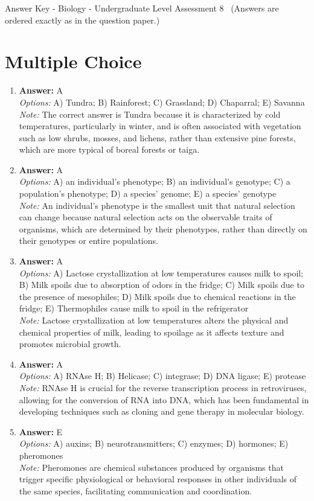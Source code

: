 \documentclass[12pt]{article}
\begin{document}
\begin{center}
Answer Key - Biology - Undergraduate Level Assessment 8 \
\small (Answers are ordered exactly as in the question paper.)
\end{center}

\section*{Multiple Choice}
\begin{enumerate}[label=\arabic*.]
\item \textbf{Answer:} A
\\ \textit{Options:} A) Tundra; B) Rainforest; C) Grassland; D) Chaparral; E) Savanna
\\ \textit{Note:} The correct answer is Tundra because it is characterized by cold temperatures, particularly in winter, and is often associated with vegetation such as low shrubs, mosses, and lichens, rather than extensive pine forests, which are more typical of boreal forests or taiga.
\item \textbf{Answer:} A
\\ \textit{Options:} A) an individual's phenotype; B) an individual's genotype; C) a population's phenotype; D) a species' genome; E) a species' genotype
\\ \textit{Note:} An individual's phenotype is the smallest unit that natural selection can change because natural selection acts on the observable traits of organisms, which are determined by their phenotypes, rather than directly on their genotypes or entire populations.
\item \textbf{Answer:} A
\\ \textit{Options:} A) Lactose crystallization at low temperatures causes milk to spoil; B) Milk spoils due to absorption of odors in the fridge; C) Milk spoils due to the presence of mesophiles; D) Milk spoils due to chemical reactions in the fridge; E) Thermophiles cause milk to spoil in the refrigerator
\\ \textit{Note:} Lactose crystallization at low temperatures alters the physical and chemical properties of milk, leading to spoilage as it affects texture and promotes microbial growth.
\item \textbf{Answer:} A
\\ \textit{Options:} A) RNAse H; B) Helicase; C) integrase; D) DNA ligase; E) protease
\\ \textit{Note:} RNAse H is crucial for the reverse transcription process in retroviruses, allowing for the conversion of RNA into DNA, which has been fundamental in developing techniques such as cloning and gene therapy in molecular biology.
\item \textbf{Answer:} E
\\ \textit{Options:} A) auxins; B) neurotransmitters; C) enzymes; D) hormones; E) pheromones
\\ \textit{Note:} Pheromones are chemical substances produced by organisms that trigger specific physiological or behavioral responses in other individuals of the same species, facilitating communication and coordination.
\end{enumerate}
\end{document}
